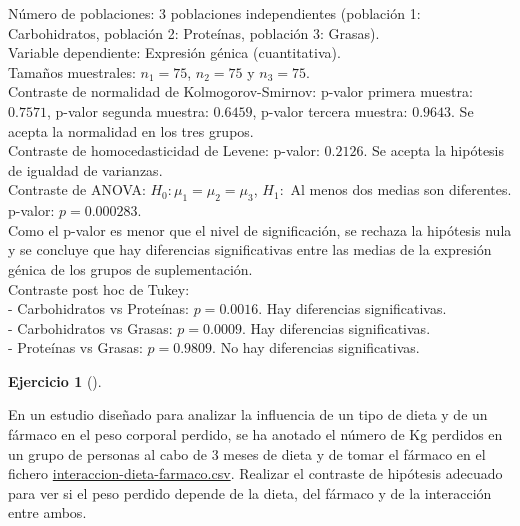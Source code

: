 \documentclass[
  a4paper,
]{scrreport}
\theoremstyle{definition}
\newtheorem{exercise}{Ejercicio}[chapter]
\theoremstyle{remark}
\begin{document}
\begin{tcolorbox}[enhanced jigsaw, opacityback=0, colback=white, breakable, toprule=.15mm, colframe=quarto-callout-tip-color-frame, coltitle=black, opacitybacktitle=0.6, leftrule=.75mm, colbacktitle=quarto-callout-tip-color!10!white, bottomtitle=1mm, bottomrule=.15mm, rightrule=.15mm, titlerule=0mm, arc=.35mm, title=\textcolor{quarto-callout-tip-color}{\faLightbulb}\hspace{0.5em}{Solución}, toptitle=1mm, left=2mm]

Número de poblaciones: 3 poblaciones independientes (población 1:
Carbohidratos, población 2: Proteínas, población 3: Grasas).\\
Variable dependiente: Expresión génica (cuantitativa).\\
Tamaños muestrales: \(n_1=75\), \(n_2=75\) y \(n_3=75\).\\
Contraste de normalidad de Kolmogorov-Smirnov: p-valor primera muestra:
\(0.7571\), p-valor segunda muestra: \(0.6459\), p-valor tercera
muestra: \(0.9643\). Se acepta la normalidad en los tres grupos.\\
Contraste de homocedasticidad de Levene: p-valor: \(0.2126\). Se acepta
la hipótesis de igualdad de varianzas.\\
Contraste de ANOVA: \(H_0:\mu_1=\mu_2=\mu_3\), \(H_1:\) Al menos dos
medias son diferentes.\\
p-valor: \(p=0.000283\).\\
Como el p-valor es menor que el nivel de significación, se rechaza la
hipótesis nula y se concluye que hay diferencias significativas entre
las medias de la expresión génica de los grupos de suplementación.\\
Contraste post hoc de Tukey:\\
- Carbohidratos vs Proteínas: \(p=0.0016\). Hay diferencias
significativas.\\
- Carbohidratos vs Grasas: \(p=0.0009\). Hay diferencias
significativas.\\
- Proteínas vs Grasas: \(p=0.9809\). No hay diferencias significativas.

\end{tcolorbox}

\begin{exercise}[]\protect\hypertarget{exr-contraste-anova-interaccion-dieta-farmaco}{}\label{exr-contraste-anova-interaccion-dieta-farmaco}

En un estudio diseñado para analizar la influencia de un tipo de dieta y
de un fármaco en el peso corporal perdido, se ha anotado el número de Kg
perdidos en un grupo de personas al cabo de 3 meses de dieta y de tomar
el fármaco en el fichero
\href{datos/interaccion-dieta-farmaco.csv}{interaccion-dieta-farmaco.csv}.
Realizar el contraste de hipótesis adecuado para ver si el peso perdido
depende de la dieta, del fármaco y de la interacción entre ambos.

\end{exercise}
\end{document}
